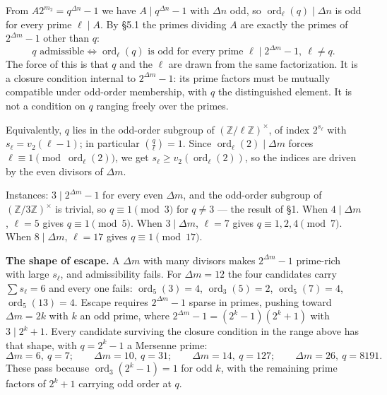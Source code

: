 \documentclass[11pt]{article}
\begin{document}
From $A 2^{m_2} = q^{\Delta n}-1$ we have $A \mid q^{\Delta n}-1$ with $\Delta n$ odd, so $\operatorname{ord}_\ell(q) \mid \Delta n$ is odd for every prime $\ell \mid A$. By \S5.1 the primes dividing $A$ are exactly the primes of $2^{\Delta m}-1$ other than $q$:
\[
q \text{ admissible} \iff \operatorname{ord}_\ell(q) \text{ is odd for every prime } \ell \mid 2^{\Delta m}-1,\ \ell \neq q .
\]
The force of this is that $q$ and the $\ell$ are drawn from the same factorization. It is a closure condition internal to $2^{\Delta m}-1$: its prime factors must be mutually compatible under odd-order membership, with $q$ the distinguished element. It is not a condition on $q$ ranging freely over the primes.

Equivalently, $q$ lies in the odd-order subgroup of $(\mathbb{Z}/\ell\mathbb{Z})^\times$, of index $2^{s_\ell}$ with $s_\ell = v_2(\ell-1)$; in particular $\left(\frac{q}{\ell}\right) = 1$. Since $\operatorname{ord}_\ell(2) \mid \Delta m$ forces $\ell \equiv 1 \pmod{\operatorname{ord}_\ell(2)}$, we get $s_\ell \geq v_2\!\left(\operatorname{ord}_\ell(2)\right)$, so the indices are driven by the even divisors of $\Delta m$.

Instances: $3 \mid 2^{\Delta m}-1$ for every even $\Delta m$, and the odd-order subgroup of $(\mathbb{Z}/3\mathbb{Z})^\times$ is trivial, so $q \equiv 1 \pmod 3$ for $q \neq 3$ --- the result of \S1. When $4 \mid \Delta m$, $\ell = 5$ gives $q \equiv 1 \pmod 5$. When $3 \mid \Delta m$, $\ell = 7$ gives $q \equiv 1, 2, 4 \pmod 7$. When $8 \mid \Delta m$, $\ell = 17$ gives $q \equiv 1 \pmod{17}$.

\medskip
\noindent\textbf{The shape of escape.} A $\Delta m$ with many divisors makes $2^{\Delta m}-1$ prime-rich with large $s_\ell$, and admissibility fails. For $\Delta m = 12$ the four candidates carry $\sum s_\ell = 6$ and every one fails: $\operatorname{ord}_5(3) = 4$, $\operatorname{ord}_3(5) = 2$, $\operatorname{ord}_5(7) = 4$, $\operatorname{ord}_5(13) = 4$. Escape requires $2^{\Delta m}-1$ sparse in primes, pushing toward $\Delta m = 2k$ with $k$ an odd prime, where $2^{\Delta m}-1 = (2^k-1)(2^k+1)$ with $3 \mid 2^k+1$. Every candidate surviving the closure condition in the range above has that shape, with $q = 2^k-1$ a Mersenne prime:
\[
\Delta m = 6,\ q = 7; \qquad \Delta m = 10,\ q = 31; \qquad \Delta m = 14,\ q = 127; \qquad \Delta m = 26,\ q = 8191 .
\]
These pass because $\operatorname{ord}_3(2^k-1) = 1$ for odd $k$, with the remaining prime factors of $2^k+1$ carrying odd order at $q$.
\end{document}
